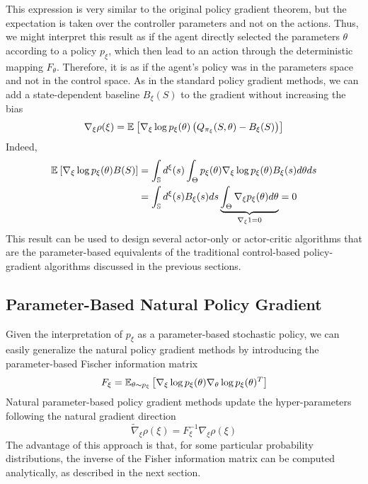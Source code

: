 This expression is very similar to the original policy gradient theorem, but
the expectation is taken over the controller parameters and not on the actions.
Thus, we might interpret this result as if the agent directly selected the parameters
$\theta$ according to a policy $p_\xi$, which then lead to an action through the deterministic mapping $F_\theta$. Therefore, it is as if the agent's policy was in the parameters space and not in the control space. As in the standard policy gradient methods, we can add a state-dependent baseline $B_\xi(S)$ to the gradient without increasing the bias
\begin{equation}
	\nabla_\xi \rho(\xi) = \E{\nabla_\xi \log p_\xi(\theta) \left(Q_{\pi_\xi}(S,
						\theta) - B_\xi(S)\right)}
\end{equation}
Indeed, 
\begin{equation*}
	\begin{split}
		\E{\nabla_\xi \log p_\xi(\theta) B(S)} 
			&= \int_\S d^\xi(s) \int_\Theta p_\xi(\theta) \nabla_\xi \log
		p_\xi(\theta) B_\xi(s) d\theta ds\\
		&= \int_\S d^\xi(s) B_\xi(s) ds \underbrace{\int_\Theta \nabla_\xi p_\xi(\theta)
	d\theta}_{\nabla_\xi 1 = 0} = 0
	\end{split}
\end{equation*}
This result can be used to design several actor-only or actor-critic algorithms that are the parameter-based equivalents of the traditional control-based policy-gradient algorithms discussed in the previous sections. 

\subsection{Parameter-Based Natural Policy Gradient}
Given the interpretation of $p_\xi$ as a parameter-based stochastic policy, we can easily generalize the natural policy gradient methods by introducing the parameter-based Fischer information matrix
\begin{equation}
	F_\xi = \E[\theta\sim p_\xi]{\nabla_\xi\log p_\xi(\theta) \nabla_\theta\log p_\xi(\theta)^T}
\end{equation}
Natural parameter-based policy gradient methods update the hyper-parameters following the natural gradient direction 
\begin{equation}
	\widetilde{\nabla}_\xi \rho(\xi) = F_\xi^{-1} \nabla_\xi \rho(\xi)
\end{equation}
The advantage of this approach is that, for some particular probability distributions, the inverse of the Fisher information matrix can be computed analytically, as described in the next section. 

